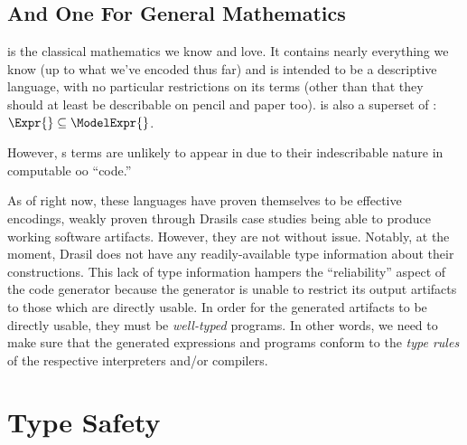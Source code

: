 \subsection{And One For General Mathematics}

\ModelExpr{} is the classical mathematics we know and love. It contains nearly
everything we know (up to what we've encoded thus far) and is intended to be a
descriptive language, with no particular restrictions on its terms (other than
that they should at least be describable on pencil and paper too). \ModelExpr{}
is also a superset of \Expr{}: \(\Expr{} \subseteq{} \ModelExpr{}\).

However, \ModelExpr{}s terms are unlikely to appear in \CodeExpr{} due to their
indescribable nature in computable \acs{oo} ``code.''

As of right now, these languages have proven themselves to be effective
encodings, weakly proven through Drasils case studies being able to produce
working software artifacts. However, they are not without issue. Notably, at the
moment, Drasil does not have any readily-available type information about their
constructions. This lack of type information hampers the ``reliability'' aspect
of the code generator because the generator is unable to restrict its output
artifacts to those which are directly usable. In order for the generated
artifacts to be directly usable, they must be \textit{well-typed} programs. In
other words, we need to make sure that the generated expressions and programs
conform to the \textit{type rules} of the respective interpreters and/or
compilers.

\section{Type Safety}

